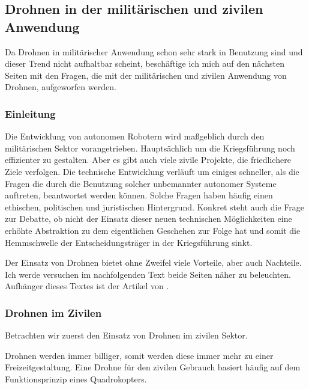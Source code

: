 \addtocounter{tmp}{-1}	%
\subsection{Drohnen in der militärischen und zivilen Anwendung}
\label{subsec:drohnen:AbwaegungderArgumente}
Da Drohnen in militärischer Anwendung schon sehr stark in Benutzung sind
und dieser Trend nicht aufhaltbar scheint,
beschäftige ich mich auf den nächsten
 Seiten mit den Fragen,
die mit der militärischen und zivilen Anwendung von Drohnen,
aufgeworfen werden.

\subsubsection{Einleitung}
\label{subsubsec:drohnen:AbwaegungderArgumente:Einleitung}
Die Entwicklung von autonomen Robotern wird maßgeblich
durch den militärischen Sektor vorangetrieben.
Hauptsächlich um die Kriegsführung noch effizienter zu gestalten.
Aber es gibt auch viele zivile Projekte,
die friedlichere Ziele verfolgen.
Die technische Entwicklung verläuft um einiges schneller, als die
Fragen die durch die Benutzung solcher unbemannter autonomer Systeme
auftreten, beantwortet werden können.
Solche Fragen haben häufig einen ethischen, politischen
und juristischen Hintergrund.
Konkret steht auch die Frage zur Debatte, ob nicht der Einsatz dieser neuen technischen
Möglichkeiten eine erhöhte Abstraktion zu dem eigentlichen Geschehen zur Folge hat
und somit die Hemmschwelle der Entscheidungsträger in der Kriegsführung sinkt.

Der Einsatz von Drohnen bietet ohne Zweifel viele Vorteile, aber auch Nachteile.
Ich werde versuchen im nachfolgenden Text beide Seiten näher zu beleuchten.
Aufhänger dieses Textes ist der Artikel von \textcite{sdw:2010-12:DfK}.

\subsubsection{Drohnen im Zivilen}
\label{subsubsec:drohnen:AbwaegungderArgumente:Zivilen}
Betrachten wir zuerst den Einsatz von Drohnen im zivilen Sektor.

Drohnen werden immer billiger, somit werden diese immer mehr
zu einer Freizeitgestaltung.
Eine Drohne für den zivilen Gebrauch basiert häufig auf dem Funktionsprinzip
eines Quadrokopters.

